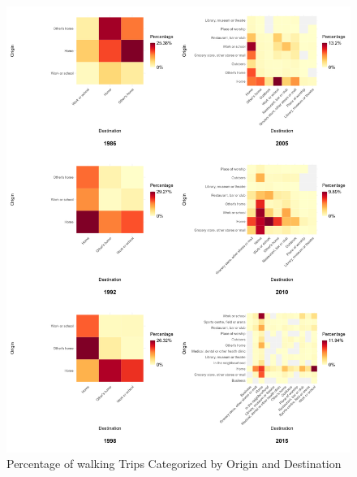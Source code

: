 \documentclass[
11pt, %
oneside, %
english, %
singlespacing, %
]{macthesis} %
\begin{document}
\begin{figure}

{\centering \includegraphics[width=1\linewidth]{figure/ch03_fig_01} 

}

\caption{Percentage of walking Trips Categorized by Origin and Destination}\label{fig:ch03-plot-fig-01}
\end{figure}
\end{document}
